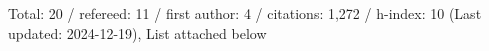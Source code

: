 Total: 20 / refereed: 11 / first author: 4 / citations: 1,272 / h-index: 10 (Last updated: 2024-12-19), List attached below